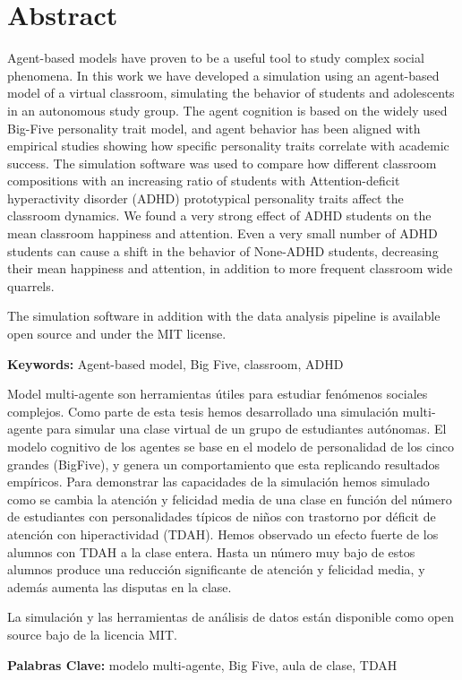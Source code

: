 \chapter{Abstract}

Agent-based models have proven to be a useful tool to study complex social phenomena.
In this work we have developed a simulation using an agent-based model of a virtual
classroom, simulating the behavior of students and adolescents in an autonomous
study group. The agent cognition is based on the widely used Big-Five personality
trait model, and agent behavior has been aligned with empirical studies showing
how specific personality traits correlate with academic success. The simulation
software was used to compare how different classroom compositions with an increasing
ratio of students with Attention-deficit hyperactivity disorder (ADHD) prototypical
personality traits affect the classroom dynamics. We found a very strong effect
of ADHD students on the mean classroom happiness and attention. Even a very small
number of ADHD students can cause a shift in the behavior of None-ADHD students,
decreasing their mean happiness and attention, in addition to more frequent classroom
wide quarrels.

\bb

The simulation software in addition with the data analysis pipeline is available
open source and under the MIT license. 

\bb

{\bf Keywords:} Agent-based model, Big Five, classroom, ADHD

\pagebreak


Model multi-agente son herramientas útiles para estudiar fenómenos sociales complejos.
Como parte de esta tesis hemos desarrollado una simulación multi-agente para
simular una clase virtual de un grupo de estudiantes autónomas. El modelo
cognitivo de los agentes se base en el modelo de personalidad de los cinco grandes
(BigFive), y genera un comportamiento que esta replicando resultados empíricos.
Para demonstrar las capacidades de la simulación hemos simulado como se cambia
la atención y felicidad media de una clase en función del número de estudiantes
con personalidades típicos de niños con trastorno por déficit de atención con
hiperactividad (TDAH). Hemos observado un efecto fuerte de los alumnos con TDAH
a la clase entera. Hasta un número muy bajo de estos alumnos produce una
reducción significante de atención y felicidad media, y además aumenta las
disputas en la clase.

\bb

La simulación y las herramientas de análisis de datos están disponible como open
source bajo de la licencia MIT.

\bb

{\bf Palabras Clave:} modelo multi-agente, Big Five, aula de clase, TDAH
